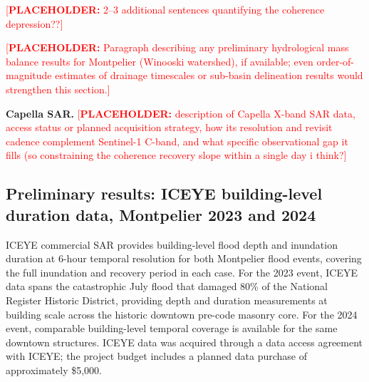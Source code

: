 \documentclass[11pt]{article}
\newcommand{\placeholder}[1]{\textcolor{red}{[\textbf{PLACEHOLDER:} #1]}}
\begin{document}
\placeholder{2–3 additional sentences quantifying the coherence depression??}

\placeholder{Paragraph describing any preliminary hydrological mass balance results for Montpelier (Winooski watershed), if available; even order-of-magnitude estimates of drainage timescales or sub-basin delineation results would strengthen this section.}

\textbf{Capella SAR.}
\placeholder{description of Capella X-band SAR data, access status or planned acquisition strategy, how its resolution and revisit cadence complement Sentinel-1 C-band, and what specific observational gap it fills (so constraining the coherence recovery slope within a single day i think?}

\vspace{-10pt}
\subsection{Preliminary results: ICEYE building-level duration data, Montpelier 2023 and 2024}

ICEYE commercial SAR provides building-level flood depth and inundation duration at
6-hour temporal resolution for both Montpelier flood events, covering the full inundation
and recovery period in each case.
For the 2023 event, ICEYE data spans the catastrophic July flood that damaged 80\% of the
National Register Historic District, providing depth and duration measurements at
building scale across the historic downtown pre-code masonry core.
For the 2024 event, comparable building-level temporal coverage is available for the
same downtown structures.
ICEYE data was acquired through a data access agreement with ICEYE; the project budget
includes a planned data purchase of approximately \$5,000.
\end{document}
